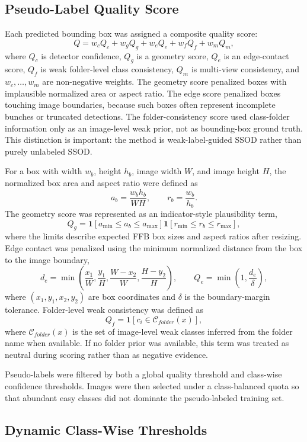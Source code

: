 ﻿\documentclass[12pt]{article}
\begin{document}
\subsection{Pseudo-Label Quality Score}

Each predicted bounding box was assigned a composite quality score:
\[
Q = w_c Q_c + w_g Q_g + w_e Q_e + w_f Q_f + w_m Q_m ,
\]
where \(Q_c\) is detector confidence, \(Q_g\) is a geometry score, \(Q_e\) is an edge-contact score, \(Q_f\) is weak folder-level class consistency, \(Q_m\) is multi-view consistency, and \(w_c,\ldots,w_m\) are non-negative weights. The geometry score penalized boxes with implausible normalized area or aspect ratio. The edge score penalized boxes touching image boundaries, because such boxes often represent incomplete bunches or truncated detections. The folder-consistency score used class-folder information only as an image-level weak prior, not as bounding-box ground truth. This distinction is important: the method is weak-label-guided SSOD rather than purely unlabeled SSOD.

For a box with width \(w_b\), height \(h_b\), image width \(W\), and image height \(H\), the normalized box area and aspect ratio were defined as
\[
a_b=\frac{w_bh_b}{WH}, \qquad r_b=\frac{w_b}{h_b}.
\]
The geometry score was represented as an indicator-style plausibility term,
\[
Q_g=\mathbf{1}\left[a_{\min}\le a_b\le a_{\max}\right]
\mathbf{1}\left[r_{\min}\le r_b\le r_{\max}\right],
\]
where the limits describe expected FFB box sizes and aspect ratios after resizing. Edge contact was penalized using the minimum normalized distance from the box to the image boundary,
\[
d_e=\min\left(\frac{x_1}{W},\frac{y_1}{H},\frac{W-x_2}{W},\frac{H-y_2}{H}\right), \qquad
Q_e=\min\left(1,\frac{d_e}{\delta}\right),
\]
where \((x_1,y_1,x_2,y_2)\) are box coordinates and \(\delta\) is the boundary-margin tolerance. Folder-level weak consistency was defined as
\[
Q_f=\mathbf{1}\left[c_i\in \mathcal{C}_{folder}(x)\right],
\]
where \(\mathcal{C}_{folder}(x)\) is the set of image-level weak classes inferred from the folder name when available. If no folder prior was available, this term was treated as neutral during scoring rather than as negative evidence.

Pseudo-labels were filtered by both a global quality threshold and class-wise confidence thresholds. Images were then selected under a class-balanced quota so that abundant easy classes did not dominate the pseudo-labeled training set.

\subsection{Dynamic Class-Wise Thresholds}
\end{document}
